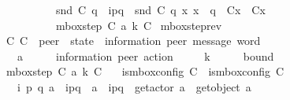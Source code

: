 \begin{isabellebody}
\ \ \ \ \ \ \ \ \ \ \ \ {\isacharparenleft}{\kern0pt}snd\ {\isacharparenleft}{\kern0pt}C{}\ q{\isacharparenright}{\kern0pt}{\isacharparenright}{\kern0pt}\ {\isacharequal}{\kern0pt}\ {\isacharbrackleft}{\kern0pt}{\isacharparenleft}{\kern0pt}i\isactrlbsup p{\isasymrightarrow}q\isactrlesup {\isacharparenright}{\kern0pt}{\isacharbrackright}{\kern0pt}\ {\isasymcdot}\ snd\ {\isacharparenleft}{\kern0pt}C{}\ q{\isacharparenright}{\kern0pt}{\isacharsemicolon}{\kern0pt}\ {\isasymforall}x{\isachardot}{\kern0pt}\ x\ {\isasymnoteq}\ q\ {\isasymlongrightarrow}\ C{}{\isacharparenleft}{\kern0pt}x{\isacharparenright}{\kern0pt}\ {\isacharequal}{\kern0pt}\ C{}{\isacharparenleft}{\kern0pt}x{\isacharparenright}{\kern0pt}{\isasymrbrakk}\ {\isasymLongrightarrow}\isanewline
\ \ \ \ \ \ \ \ \ \ \ \ mbox{\isacharunderscore}{\kern0pt}step\ C{}\ a\ k\ C{}{\isachardoublequoteclose}\isanewline
\isanewline
{}\isamarkupfalse%
\ mbox{\isacharunderscore}{\kern0pt}step{\isacharunderscore}{\kern0pt}rev{\isacharcolon}{\kern0pt}\isanewline
\ \ \ C{}\ C{}\ {\isacharcolon}{\kern0pt}{\isacharcolon}{\kern0pt}\ {\isachardoublequoteopen}{\isacharprime}{\kern0pt}peer\ {\isasymRightarrow}\ {\isacharparenleft}{\kern0pt}{\isacharprime}{\kern0pt}state\ {\isasymtimes}\ {\isacharparenleft}{\kern0pt}{\isacharprime}{\kern0pt}information{\isacharcomma}{\kern0pt}\ {\isacharprime}{\kern0pt}peer{\isacharparenright}{\kern0pt}\ message\ word{\isacharparenright}{\kern0pt}{\isachardoublequoteclose}\isanewline
\ \ \ \ \ a\ \ \ \ \ {\isacharcolon}{\kern0pt}{\isacharcolon}{\kern0pt}\ {\isachardoublequoteopen}{\isacharparenleft}{\kern0pt}{\isacharprime}{\kern0pt}information{\isacharcomma}{\kern0pt}\ {\isacharprime}{\kern0pt}peer{\isacharparenright}{\kern0pt}\ action{\isachardoublequoteclose}\isanewline
\ \ \ \ \ k\ \ \ \ \ {\isacharcolon}{\kern0pt}{\isacharcolon}{\kern0pt}\ {\isachardoublequoteopen}bound{\isachardoublequoteclose}\isanewline
\ \ \ {\isachardoublequoteopen}mbox{\isacharunderscore}{\kern0pt}step\ C{}\ a\ k\ C{}{\isachardoublequoteclose}\isanewline
\ \ \ {\isachardoublequoteopen}is{\isacharunderscore}{\kern0pt}mbox{\isacharunderscore}{\kern0pt}config\ C{}{\isachardoublequoteclose}\ \ {\isachardoublequoteopen}is{\isacharunderscore}{\kern0pt}mbox{\isacharunderscore}{\kern0pt}config\ C{}{\isachardoublequoteclose}\isanewline
\ \ \ \ \ {\isachardoublequoteopen}{\isasymexists}i\ p\ q{\isachardot}{\kern0pt}\ a\ {\isacharequal}{\kern0pt}\ {\isacharbang}{\kern0pt}{\isasymlangle}{\isacharparenleft}{\kern0pt}i\isactrlbsup p{\isasymrightarrow}q\isactrlesup {\isacharparenright}{\kern0pt}{\isasymrangle}\ {\isasymor}\ a\ {\isacharequal}{\kern0pt}\ {\isacharquery}{\kern0pt}{\isasymlangle}{\isacharparenleft}{\kern0pt}i\isactrlbsup p{\isasymrightarrow}q\isactrlesup {\isacharparenright}{\kern0pt}{\isasymrangle}{\isachardoublequoteclose}\ \ {\isachardoublequoteopen}get{\isacharunderscore}{\kern0pt}actor\ a\ {\isasymnoteq}\ get{\isacharunderscore}{\kern0pt}object\ a{\isachardoublequoteclose}\isanewline

\end{isabellebody}
